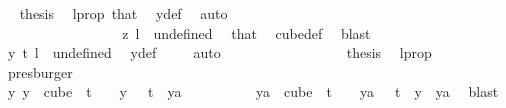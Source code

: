 \begin{isabellebody}
\ \isamarkupfalse%
\ {\isacharquery}{\kern0pt}thesis\ \isamarkupfalse%
\ l{\isacharunderscore}{\kern0pt}prop\ that{\isacharparenleft}{\kern0pt}{}{\isacharparenright}{\kern0pt}\ \isamarkupfalse%
\ y{\isacharunderscore}{\kern0pt}def\ \isamarkupfalse%
\ auto\isanewline
\ \ \ \ \ \ \ \ \ \ \ \ \isamarkupfalse%
\isanewline
\ \ \ \ \ \ \ \ \ \ \ \ \ \ \isamarkupfalse%
\ {}\isanewline
\ \ \ \ \ \ \ \ \ \ \ \ \ \ \isamarkupfalse%
\ \isamarkupfalse%
\ {\isachardoublequoteopen}z\ l\ {\isacharequal}{\kern0pt}\ undefined{\isachardoublequoteclose}\ \isamarkupfalse%
\ that\ \isamarkupfalse%
\ cube{\isacharunderscore}{\kern0pt}def\ \isamarkupfalse%
\ blast\isanewline
\ \ \ \ \ \ \ \ \ \ \ \ \ \ \isamarkupfalse%
\ \isamarkupfalse%
\ {\isachardoublequoteopen}y\ t\ l\ {\isacharequal}{\kern0pt}\ undefined{\isachardoublequoteclose}\ \isamarkupfalse%
\ y{\isacharunderscore}{\kern0pt}def\ \isamarkupfalse%
\ {}\ \isamarkupfalse%
\ auto\isanewline
\ \ \ \ \ \ \ \ \ \ \ \ \ \ \isamarkupfalse%
\ \isamarkupfalse%
\ {\isacharquery}{\kern0pt}thesis\ \isamarkupfalse%
\ l{\isacharunderscore}{\kern0pt}prop\ \isamarkupfalse%
\ presburger\isanewline
\ \ \ \ \ \ \ \ \ \ \ \ \isamarkupfalse%
\isanewline
\ \ \ \ \ \ \ \ \ \ \isamarkupfalse%
\isanewline
\ \ \ \ \ \ \ \ \ \ \isamarkupfalse%
\ \isamarkupfalse%
\ {\isachardoublequoteopen}{\isasymexists}y{\isachardot}{\kern0pt}\ {\isacharparenleft}{\kern0pt}y\ {\isasymin}\ cube\ {}\ {\isacharparenleft}{\kern0pt}t\ {\isacharplus}{\kern0pt}\ {}{\isacharparenright}{\kern0pt}\ {\isasymand}\ y\ {}\ {\isacharequal}{\kern0pt}\ t{\isacharparenright}{\kern0pt}\ {\isasymand}\ {\isacharparenleft}{\kern0pt}{\isasymforall}ya{\isachardot}{\kern0pt}\isanewline
\ \ \ \ \ \ \ \ \ \ ya\ {\isasymin}\ cube\ {}\ {\isacharparenleft}{\kern0pt}t\ {\isacharplus}{\kern0pt}\ {}{\isacharparenright}{\kern0pt}\ {\isasymand}\ ya\ {}\ {\isacharequal}{\kern0pt}\ t\ {\isasymlongrightarrow}\ y\ {\isacharequal}{\kern0pt}\ ya{\isacharparenright}{\kern0pt}{\isachardoublequoteclose}\ \isamarkupfalse%
\ blast\isanewline
\ \ \ \ \ \ \ \ \isamarkupfalse%

\end{isabellebody}
